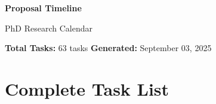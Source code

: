 \documentclass[a4paper]{article}
\begin{document}
\begin{titlepage}
\centering
\vspace*{0.5cm}

{\LARGE\textbf{Proposal Timeline}}

\vspace{0.3cm}
{\large PhD Research Calendar}

\vspace{0.5cm}

\begin{minipage}{0.95\textwidth}
\centering
\textbf{Total Tasks:} 63 tasks \hfill \textbf{Generated:} September 03, 2025
\end{minipage}

\vfill

\end{titlepage}

\newpage

\section{Complete Task List}
\vspace{0.1cm}
\end{document}
